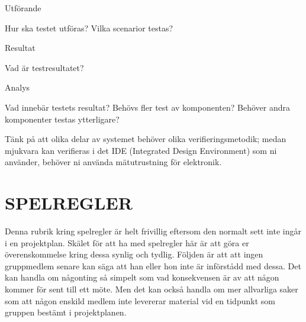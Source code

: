 \documentclass[a4paper]{article}
\begin{document}
Utförande

    Hur ska testet utföras? Vilka scenarior testas?

Resultat

    Vad är testresultatet?

Analys

    Vad innebär testets resultat? Behövs fler test av komponenten?
    Behöver andra komponenter testas ytterligare?

Tänk på att olika delar av systemet behöver olika verifieringsmetodik;
medan mjukvara kan verifieras i det IDE (Integrated Design Environment)
som ni använder, behöver ni använda mätutrustning för elektronik.



\section{SPELREGLER}


Denna rubrik kring spelregler är helt frivillig eftersom den normalt
sett inte ingår i en projektplan. Skälet för att ha med spelregler här
är att göra er överenskommelse kring dessa synlig och tydlig. Följden är
att att ingen gruppmedlem senare kan säga att han eller hon inte är
införstådd med dessa. Det kan handla om någonting så simpelt som vad
konsekvensen är av att någon kommer för sent till ett möte. Men det kan
också handla om mer allvarliga saker som att någon enskild medlem inte
levererar material vid en tidpunkt som gruppen bestämt i projektplanen.



\end{document}

